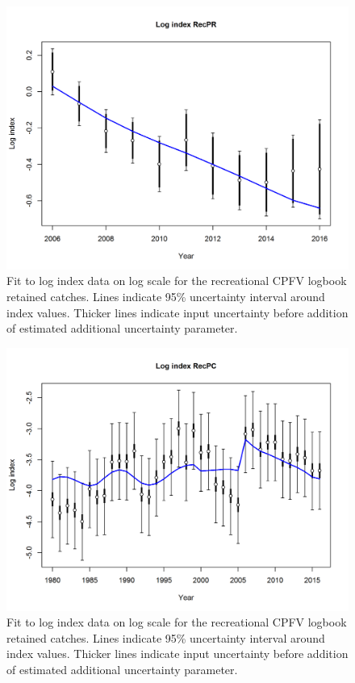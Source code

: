 \documentclass[12pt,]{article}
\begin{document}
\begin{figure}[htbp]
\centering
\includegraphics{r4ss/plots_mod1/index5_logcpuefit_RecPR.png}
\caption{Fit to log index data on log scale for the recreational CPFV
logbook retained catches. Lines indicate 95\% uncertainty interval
around index values. Thicker lines indicate input uncertainty before
addition of estimated additional uncertainty parameter.
\label{fig:index5_logcpuefit_RecPR}}
\end{figure}

\begin{figure}[htbp]
\centering
\includegraphics{r4ss/plots_mod1/index5_logcpuefit_RecPC.png}
\caption{Fit to log index data on log scale for the recreational CPFV
logbook retained catches. Lines indicate 95\% uncertainty interval
around index values. Thicker lines indicate input uncertainty before
addition of estimated additional uncertainty parameter.
\label{fig:index5_logcpuefit_RecPC}}
\end{figure}
\end{document}
